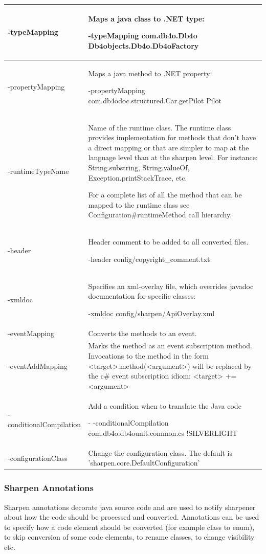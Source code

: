 {\begin{longtable}{|p{}|p{}|}
-typeMapping & Maps a java class to .NET type:\par -typeMapping com.db4o.Db4o Db4objects.Db4o.Db4oFactory \\ \hline
-propertyMapping & Maps a java method to .NET property:\par -propertyMapping com.db4odoc.structured.Car.getPilot Pilot \\ \hline
-runtimeTypeName & Name of the runtime class. The runtime class provides implementation for methods that don't have a direct mapping or that are simpler to map at the language level than at the sharpen level. For instance: String.substring, String.valueOf, Exception.printStackTrace, etc.\par For a complete list of all the method that can be mapped to the runtime class see Configuration\#runtimeMethod call hierarchy. \\ \hline
-header & Header comment to be added to all converted files.\par -header config/copyright\_comment.txt \\ \hline
-xmldoc & Specifies an xml-overlay file, which overrides javadoc documentation for specific classes:\par -xmldoc config/sharpen/ApiOverlay.xml \\ \hline
-eventMapping & Converts the methods to an event. \\ \hline
-eventAddMapping & Marks the method as an event subscription method. Invocations to the method in the form \textless{}target\textgreater{}.method(\textless{}argument\textgreater{}) will be replaced by the c\# event subscription idiom: \textless{}target\textgreater{} += \textless{}argument\textgreater{} \\ \hline
-conditionalCompilation & Add a condition when to translate the Java code\par - -conditionalCompilation com.db4o.db4ounit.common.cs !SILVERLIGHT \\ \hline
-configurationClass & Change the configuration class. The default is 'sharpen.core.DefaultConfiguration' \\ \hline
\end{longtable}}

\subsubsection{Sharpen Annotations}
\label{ref:community-working-with-source-sharpen-sharpen-annotations}

Sharpen annotations decorate java source code and are used to notify sharpener about how the code should be processed and converted. Annotations can be used to specify how a code element should be converted (for example class to enum), to skip conversion of some code elements, to rename classes, to change visibility etc.

